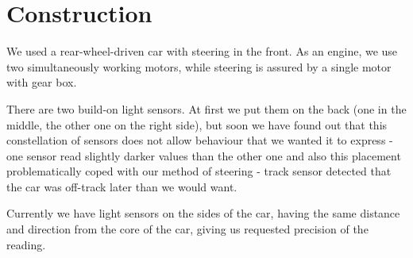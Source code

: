 \section{Construction}
We used a rear-wheel-driven car with steering in the front. As an engine, we use two simultaneously working motors, while steering is assured by a single motor with gear box. 

There are two build-on light sensors. At first we put them on the back (one in the middle, the other one on the right side), but soon we have found out that this constellation of sensors does not allow behaviour that we wanted it to express - one sensor read slightly darker values than the other one and also this placement problematically coped with our method of steering - track sensor detected that the car was off-track later than we would want.

Currently we have light sensors on the sides of the car, having the same distance and direction from the core of the car, giving us requested precision of the reading.
